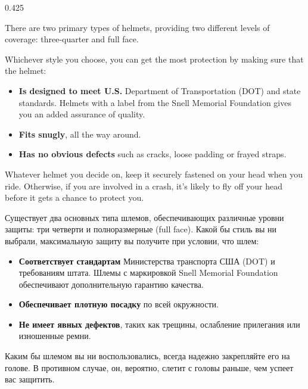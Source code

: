 \begin{langblock}{0.425} 
	\begin{eng}
	There are two primary types of helmets, providing two different levels of coverage: three-quarter and full face.
	
	Whichever style you choose, you can get the most protection by making sure that the helmet:
	\begin{itemize}
		\item \textbf{Is designed to meet U.S.} Department of Transportation (DOT) and state standards. Helmets with a label from the Snell Memorial Foundation gives you an added assurance of quality.
		\item \textbf{Fits snugly}, all the way around.
		\item \textbf{Has no obvious defects} such as cracks, loose padding or frayed straps.
	\end{itemize}
	Whatever helmet you decide on, keep it securely fastened on your head when you ride. Otherwise, if you are involved in a crash, it's likely to fly off your head before it gets a chance to protect you.
	
	\end{eng}
	\begin{rus}
		Существует два основных типа шлемов, обеспечивающих различные уровни защиты: три четверти и полноразмерные (full face). Какой бы стиль вы ни выбрали, максимальную защиту вы получите при условии, что шлем:
		\begin{itemize}
			\item \textbf{Соответствует стандартам} Министерства транспорта США (DOT) и требованиям штата. Шлемы с маркировкой Snell Memorial Foundation обеспечивают дополнительную гарантию качества.
			\item \textbf{Обеспечивает плотную посадку} по всей окружности.
			\item \textbf{Не имеет явных дефектов}, таких как трещины, ослабление прилегания или изношенные ремни.
		\end{itemize}
		Каким бы шлемом вы ни воспользовались, всегда надежно закрепляйте его на голове. В противном случае, он, вероятно, слетит с головы раньше, чем успеет вас защитить.
\end{rus}
\end{langblock}




